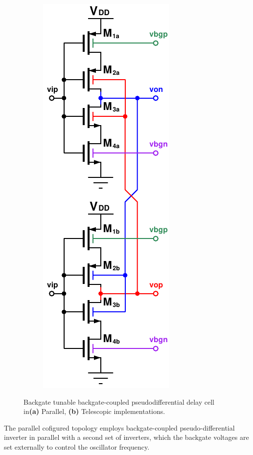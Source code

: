 \begin{figure}[htb!]
\begin{subfigure}{0.5\textwidth}
			        \includegraphics[height=0.5\textheight, angle=0]{./figs/design/tele_delay_cell2}
			        \caption{ }
			        \label{fig:telescopic_delay_cell}
			    \end{subfigure}
			    \label{fig:tunable_delay_cells}
			    \caption{Backgate tunable backgate-coupled pseudodifferential delay cell in\textbf{(a)} Parallel, \textbf{(b)} Telescopic implementations.}
			\end{figure} 


			The parallel cofigured topology employs backgate-coupled pseudo-differential inverter in parallel with a second set of inverters, which the backgate voltages are set externally to control the oscillator frequency. 


